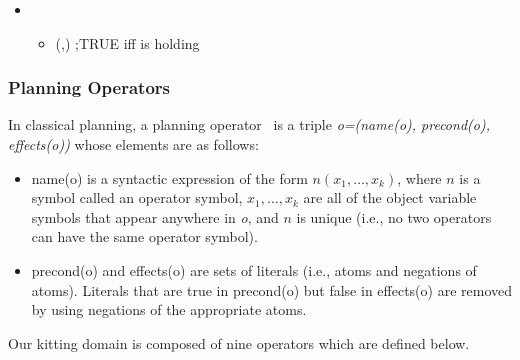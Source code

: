 \begin{itemize}
 \item {}
  \begin{itemize}
    \item {}(,) ;TRUE iff  is holding 
  \end{itemize}
\end{itemize}


\subsubsection{Planning Operators}
 In classical planning, a planning operator~\cite{NAU.2004} is a triple \textit{o=(name(o), precond(o), effects(o))} whose elements are as follows:
\begin{itemize}
\item name(o) is a syntactic expression of the form $n(x_1,\dots,x_k)$, where $n$ is a symbol
called an operator symbol, $x_1,\dots,x_k$ are all of the object variable symbols that
appear anywhere in \textit{o}, and $n$ is unique (i.e., no two operators can have the
same operator symbol).
\item precond(o) and effects(o) are sets of literals (i.e., atoms and negations of atoms). Literals that are true in precond(o) but false in effects(o) are removed by using negations of the appropriate atoms.
\end{itemize}

Our kitting domain is composed of nine operators which are defined below.


